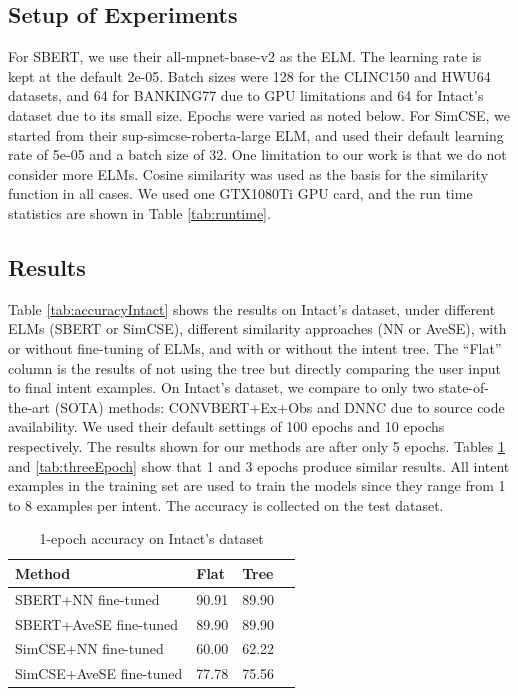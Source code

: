 \documentclass[sigconf, anonymous=true]{acmart}
\begin{document}
\subsection{\textbf{Setup of Experiments}}

For SBERT, we use their all-mpnet-base-v2 as the ELM. The learning rate is kept at the default 2e-05. Batch sizes were 128 for the CLINC150 and HWU64 datasets, and 64 for BANKING77 due to GPU limitations and 64 for Intact's dataset due to its small size. Epochs were varied as noted below. For SimCSE, we started from their sup-simcse-roberta-large ELM, and used their default learning rate of 5e-05 and a batch size of 32. One limitation to our work is that we do not consider more ELMs. Cosine similarity was used as the basis for the similarity function in all cases. We used one GTX1080Ti GPU card, and the run time statistics are shown in Table \ref{tab:runtime}. 
 
\subsection{\textbf{Results}}

Table \ref{tab:accuracyIntact} shows the results on Intact's dataset, under different ELMs (SBERT or SimCSE), different similarity approaches (NN or AveSE), with or without fine-tuning of ELMs, and with or without the intent tree. The “Flat” column is the results of not using the tree but directly comparing the user input to final intent examples. On Intact's dataset, we compare to only two state-of-the-art (SOTA) methods: CONVBERT+Ex+Obs \citep{mehri-eric-2021-example} and DNNC \citep{zhang-etal-2020-discriminative} due to source code availability. We used their default settings of 100 epochs and 10 epochs respectively. The results shown for our methods are after only 5 epochs. Tables \ref{tab:oneEpoch} and \ref{tab:threeEpoch} show that 1 and 3 epochs produce similar results. All intent examples in the training set are used to train the models since they range from 1 to 8 examples per intent. The accuracy is collected on the test dataset.  

\begin{table}[h]
\setlength{} %
\footnotesize\centering
\begin{tabular}{llll}
\hline \textbf{Method} & \textbf{Flat} & \textbf{Tree} \\
\hline SBERT+NN fine-tuned & 90.91 & 89.90  \\
SBERT+AveSE fine-tuned & 89.90 & 89.90  \\
SimCSE+NN fine-tuned & 60.00 & 62.22  \\
SimCSE+AveSE fine-tuned & 77.78 & 75.56  \\
\hline
\end{tabular}
\caption{1-epoch accuracy on Intact's dataset}
\label{tab:oneEpoch}
\end{table}
\end{document}
